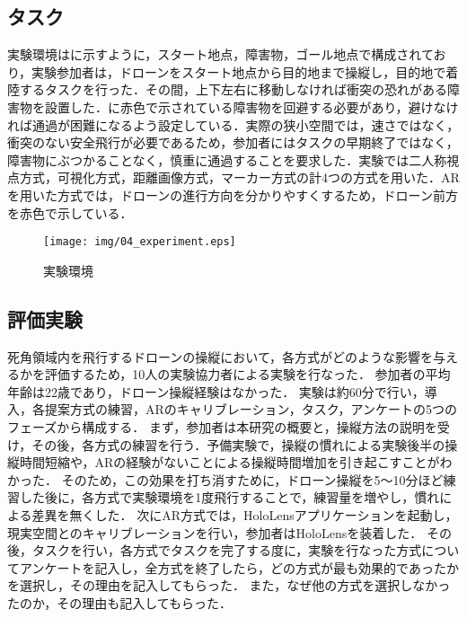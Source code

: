 \documentclass[submit, sigrecommended]{ipsj}
\begin{document}
\subsection{タスク}
実験環境はに示すように，スタート地点，障害物，ゴール地点で構成されており，実験参加者は，ドローンをスタート地点から目的地まで操縦し，目的地で着陸するタスクを行った．その間，上下左右に移動しなければ衝突の恐れがある障害物を設置した．に赤色で示されている障害物を回避する必要があり，避けなければ通過が困難になるよう設定している．実際の狭小空間では，速さではなく，衝突のない安全飛行が必要であるため，参加者にはタスクの早期終了ではなく，障害物にぶつかることなく，慎重に通過することを要求した．実験では二人称視点方式，可視化方式，距離画像方式，マーカー方式の計4つの方式を用いた．ARを用いた方式では，ドローンの進行方向を分かりやすくするため，ドローン前方を赤色で示している．

\begin{figure}[tb]
  \centering
  \texttt{[image: img/04\_experiment.eps]}
  \caption{実験環境}
  \label{fig:04_experiment}
\end{figure}

\subsection{評価実験}
死角領域内を飛行するドローンの操縦において，各方式がどのような影響を与えるかを評価するため，10人の実験協力者による実験を行なった．
参加者の平均年齢は22歳であり，ドローン操縦経験はなかった．
実験は約60分で行い，導入，各提案方式の練習，ARのキャリブレーション，タスク，アンケートの5つのフェーズから構成する．
まず，参加者は本研究の概要と，操縦方法の説明を受け，その後，各方式の練習を行う．予備実験で，操縦の慣れによる実験後半の操縦時間短縮や，ARの経験がないことによる操縦時間増加を引き起こすことがわかった．
そのため，この効果を打ち消すために，ドローン操縦を5〜10分ほど練習した後に，各方式で実験環境を1度飛行することで，練習量を増やし，慣れによる差異を無くした．
次にAR方式では，HoloLensアプリケーションを起動し，現実空間とのキャリブレーションを行い，参加者はHoloLensを装着した．
その後，タスクを行い，各方式でタスクを完了する度に，実験を行なった方式についてアンケートを記入し，全方式を終了したら，どの方式が最も効果的であったかを選択し，その理由を記入してもらった．
また，なぜ他の方式を選択しなかったのか，その理由も記入してもらった．
\end{document}
